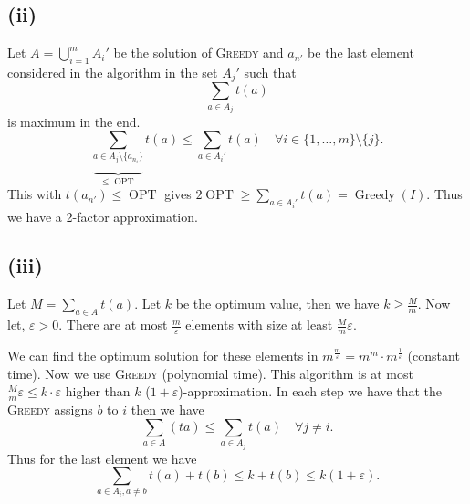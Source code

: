 \documentclass[oneside,a4paper]{amsart}
\DeclareMathOperator{\OPT}{OPT}
\begin{document}
\subsection*{(ii)}
Let $A = \bigcup_{i=1}^m A_i'$ be the solution of \textsc{Greedy} and $a_{n'}$ be the last element considered in the algorithm in the set $A_j'$ such that
\[
	\sum_{a \in A_j} t(a)
\]
is maximum in the end.
\[
	\underbrace{ \sum_{a \in A_j \setminus \{ a_{n_i} \}} }_{\leq \OPT} t(a) \leq \sum_{a \in A_i'} t(a) \quad \forall i \in \{ 1, \ldots, m \} \setminus \{ j \}.
\]
This with $t(a_{n'}) \leq \OPT$ gives $2 \OPT \geq \sum_{a \in A_i'} t(a) = \operatorname{Greedy}(I)$. Thus we have a 2-factor approximation.
\subsection*{(iii)}
Let $M = \sum_{a \in A} t(a)$. Let $k$ be the optimum value, then we have $k \geq \frac{M}{m}$.
Now let, $\varepsilon > 0$. There are at most $\frac{m}{\varepsilon}$ elements with size at least $\frac{M}{m} \varepsilon$.

We can find the optimum solution for these elements in $m^{\frac{m}{\varepsilon}} = m^m \cdot m^{\frac{1}{\varepsilon}}$ (constant time). Now we use \textsc{Greedy} (polynomial time). This algorithm is at most $\frac{M}{m} \varepsilon \leq k \cdot \varepsilon$ higher than $k$ ($1 + \varepsilon$)-approximation. In each step we have that the \textsc{Greedy} assigns $b$ to $i$ then we have
\[
\sum_{a \in A} (ta) \leq \sum_{a \in A_j} t(a) \quad \forall j \neq i.
\]
Thus for the last element we have
\[
\sum_{a \in A_i, a \neq b} t(a) + t(b) \leq k + t(b) \leq k (1+\varepsilon).
\]
\end{document}
